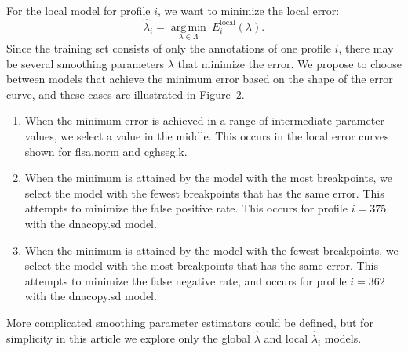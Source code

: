 \documentclass[10pt]{bmc_article}
\newcommand{\argmin}{\operatorname*{arg\, min}}
\newcommand{\model}[1]{#1}
\newenvironment{bmcformat}{\begin{raggedright}\baselineskip20pt\sloppy\setboolean{publ}{false}}{\end{raggedright}\baselineskip20pt\sloppy}
\begin{document}
\begin{bmcformat}
For the local model for profile $i$, we want to minimize the local
error:
\begin{equation}
  \label{eq:hat_lambda_i}
  \hat \lambda_i=\argmin_{\lambda\in\Lambda}\  E_i^\text{local}(\lambda).
\end{equation}
Since the training set consists of only the annotations of one profile
$i$, there may be several smoothing parameters $\lambda$ that minimize
the error.
\label{pick} We propose to choose between models that achieve the
minimum error based on the shape of the error curve, and these cases
are illustrated in Figure~2.
\begin{enumerate}
\item When the minimum error is achieved in a range of intermediate
  parameter values, we select a value in the middle. This occurs in the
  local error curves shown for \model{flsa.norm} and
  \model{cghseg.k}.
\item When the minimum is attained by the model with the most
  breakpoints, we select the model with the fewest breakpoints that has
  the same error. This attempts to minimize the false positive
  rate. This occurs for profile $i=375$ with
  the \model{dnacopy.sd} model.
\item When the minimum is attained by the model with the fewest
  breakpoints, we select the model with the most breakpoints that has
  the same error. This attempts to minimize the false negative rate,
  and occurs for profile $i=362$ with 
  the \model{dnacopy.sd} model.
\end{enumerate}
More complicated smoothing parameter estimators could be defined, but
for simplicity in this article we explore only the global $\hat
\lambda$ and local $\hat \lambda_i$ models.



\end{bmcformat}
\end{document}
